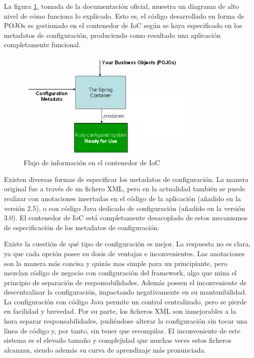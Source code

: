 \documentclass[a4paper,12pt,twoside,openright]{report}
\begin{document}
    La figura \ref{fig:container_magic}, tomada de la documentación oficial, muestra un diagrama de alto nivel de cómo funciona lo explicado. Esto es, el código desarrollado en forma de POJOs es gestionado en el contenedor de IoC según se haya especificado en los metadatos de configuración, produciendo como resultado una aplicación completamente funcional.
    
    \begin{figure}[hbt!]
    	\centering
    	\includegraphics[width=0.8\textwidth,keepaspectratio]{container_magic}
    	\caption{Flujo de información en el contenedor de IoC}
    	\label{fig:container_magic}
    \end{figure}
    
    Existen diversas formas de especificar los metadatos de configuración. La manera original fue a través de un fichero XML, pero en la actualidad también se puede realizar con anotaciones insertadas en el código de la aplicación (añadido en la versión 2.5), o con código Java dedicado de configuración (añadido en la versión 3.0). El contenedor de IoC está completamente desacoplado de estos mecanismos de especificación de los metadatos de configuración.
    
    Existe la cuestión de qué tipo de configuración es mejor. La respuesta no es clara, ya que cada opción posee su dosis de ventajas e inconvenientes. Las anotaciones son la manera más concisa y quizás mas simple para un principiante, pero mezclan código de negocio con configuración del framework, algo que mina el principio de separación de responsabilidades. Además poseen el inconveniente de descentralizar la configuración, impactando negativamente en su mantenibilidad. La configuración con código Java permite un control centralizado, pero se pierde en facilidad y brevedad. Por su parte, los ficheros XML son inmejorables a la hora separar responsabilidades, pudiéndose alterar la configuración sin tocar una línea de código y, por tanto, sin tener que recompilar. El inconveniente de este sistema es el elevado tamaño y complejidad que muchas veces estos ficheros alcanzan, siendo además su curva de aprendizaje más pronunciada.
    
\end{document}

